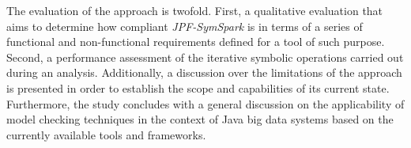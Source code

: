 The evaluation of the approach is twofold. First, a qualitative evaluation that aims to determine how compliant \textit{JPF-SymSpark} is in terms of a series of functional and non-functional requirements defined for a tool of such purpose. Second, a performance assessment of the iterative symbolic operations carried out during an analysis. Additionally, a discussion over the limitations of the approach is presented in order to establish the scope and capabilities of its current state. Furthermore, the study concludes with a general discussion on the applicability of model checking techniques in the context of Java big data systems based on the currently available tools and frameworks.